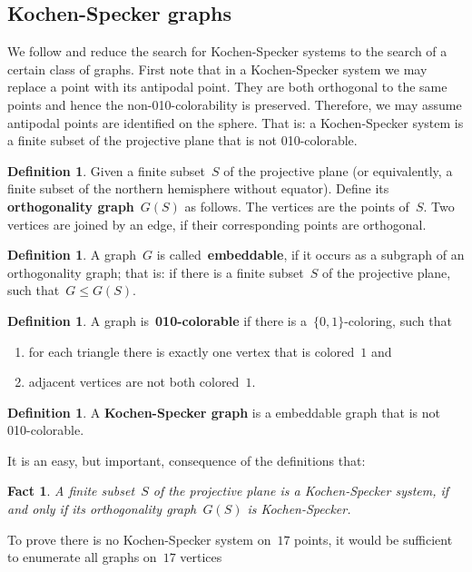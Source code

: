 \documentclass[adraft,copyright,creativecommons]{eptcs}
\newcommand{\keyword}[1]{\textbf{#1}}
\newcounter{main}
\newtheorem{fact}[main]{Fact}
\theoremstyle{definition}
\newtheorem{dfn}[main]{Definition}
\theoremstyle{remark}
\begin{document}
\subsection{Kochen-Specker graphs}
\label{sec:ksgraphs}
We follow \cite{aow11} and reduce the search for Kochen-Specker systems
to the search of a certain class of graphs.
First note that in a Kochen-Specker system we may replace a point with its
antipodal point.  They are both orthogonal to the same points and hence
the non-010-colorability is preserved.
Therefore, we may assume antipodal points are identified on the sphere.
That is: a Kochen-Specker system is a finite subset of the projective plane
that is not 010-colorable.

\begin{dfn}
Given a finite subset~$S$ of the projective plane
(or equivalently, a finite subset of the northern
hemisphere without equator).
Define its \keyword{orthogonality graph}~$G(S)$ as follows.
The vertices are the points of~$S$.
Two vertices are joined by an edge, if their corresponding points
are orthogonal.
\end{dfn}
\begin{dfn}
A graph~$G$ is called~\keyword{embeddable},
if it occurs as a subgraph of an orthogonality graph;
that is: if there is a finite subset~$S$ of the projective plane,
such that~$G \leq G(S)$.
\end{dfn}
\begin{dfn}
A graph is~\keyword{010-colorable}
if there is a~$\{0,1\}$-coloring, such that
\begin{enumerate}
\item
for each triangle there is exactly one vertex that is colored~$1$ and
\item
adjacent vertices are not both colored~$1$.
\end{enumerate}
\end{dfn}
\begin{dfn}
A \keyword{Kochen-Specker graph}
is a embeddable graph that is not 010-colorable.
\end{dfn}
It is an easy, but important, consequence of the definitions that:
\begin{fact}
    A finite subset~$S$ of the projective plane
    is a Kochen-Specker system,
    if and only if its orthogonality graph~$G(S)$
    is Kochen-Specker.
\end{fact}
To prove there is no Kochen-Specker system on~$17$ points,
it would be sufficient to enumerate all graphs on~$17$ vertices
\end{document}
